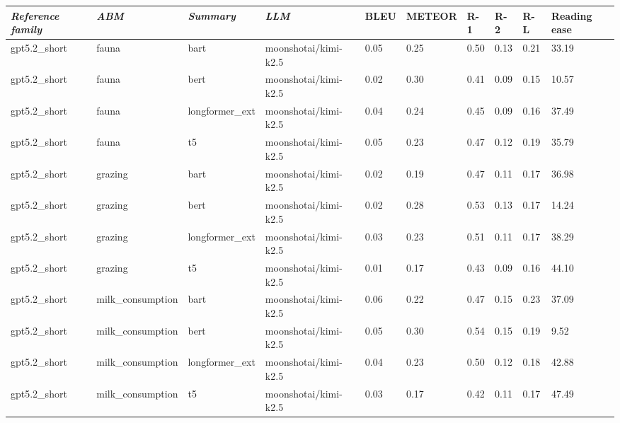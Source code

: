\begin{tabular}{|l|l|l|l|l|l|l|l|l|l|}
\hline
\textit{\textbf{Reference family}} & \textit{\textbf{ABM}} & \textit{\textbf{Summary}} & \textit{\textbf{LLM}} & BLEU & METEOR & R-1 & R-2 & R-L & Reading ease \\
 \hline
 gpt5.2\_short & fauna & bart & moonshotai/kimi-k2.5 & 0.05 & 0.25 & 0.50 & 0.13 & 0.21 & 33.19 \\
 \hline
 gpt5.2\_short & fauna & bert & moonshotai/kimi-k2.5 & 0.02 & 0.30 & 0.41 & 0.09 & 0.15 & 10.57 \\
 \hline
 gpt5.2\_short & fauna & longformer\_ext & moonshotai/kimi-k2.5 & 0.04 & 0.24 & 0.45 & 0.09 & 0.16 & 37.49 \\
 \hline
 gpt5.2\_short & fauna & t5 & moonshotai/kimi-k2.5 & 0.05 & 0.23 & 0.47 & 0.12 & 0.19 & 35.79 \\
 \hline
 gpt5.2\_short & grazing & bart & moonshotai/kimi-k2.5 & 0.02 & 0.19 & 0.47 & 0.11 & 0.17 & 36.98 \\
 \hline
 gpt5.2\_short & grazing & bert & moonshotai/kimi-k2.5 & 0.02 & 0.28 & 0.53 & 0.13 & 0.17 & 14.24 \\
 \hline
 gpt5.2\_short & grazing & longformer\_ext & moonshotai/kimi-k2.5 & 0.03 & 0.23 & 0.51 & 0.11 & 0.17 & 38.29 \\
 \hline
 gpt5.2\_short & grazing & t5 & moonshotai/kimi-k2.5 & 0.01 & 0.17 & 0.43 & 0.09 & 0.16 & 44.10 \\
 \hline
 gpt5.2\_short & milk\_consumption & bart & moonshotai/kimi-k2.5 & 0.06 & 0.22 & 0.47 & 0.15 & 0.23 & 37.09 \\
 \hline
 gpt5.2\_short & milk\_consumption & bert & moonshotai/kimi-k2.5 & 0.05 & 0.30 & 0.54 & 0.15 & 0.19 & 9.52 \\
 \hline
 gpt5.2\_short & milk\_consumption & longformer\_ext & moonshotai/kimi-k2.5 & 0.04 & 0.23 & 0.50 & 0.12 & 0.18 & 42.88 \\
 \hline
 gpt5.2\_short & milk\_consumption & t5 & moonshotai/kimi-k2.5 & 0.03 & 0.17 & 0.42 & 0.11 & 0.17 & 47.49 \\
\hline
\end{tabular}

